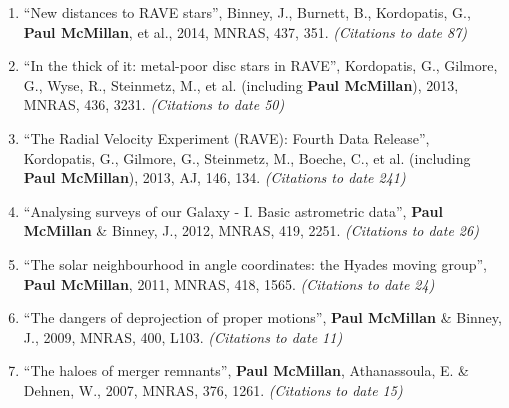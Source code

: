 \documentclass{resume}
\begin{document}
\begin{enumerate}
\item ``New distances to RAVE stars'', Binney, J., Burnett, B., Kordopatis, G., \textbf{Paul McMillan}, et al., 2014, MNRAS, 437, 351. \textit{(Citations to date 87)}

\item ``In the thick of it: metal-poor disc stars in RAVE'', Kordopatis, G., Gilmore, G., Wyse, R., Steinmetz, M., et al. (including \textbf{Paul McMillan}), 2013, MNRAS, 436, 3231. \textit{(Citations to date 50)}

\item ``The Radial Velocity Experiment (RAVE): Fourth Data Release'', Kordopatis, G., Gilmore, G., Steinmetz, M., Boeche, C., et al. (including \textbf{Paul McMillan}), 2013, AJ, 146, 134. \textit{(Citations to date 241)}

\item ``Analysing surveys of our Galaxy - I. Basic astrometric data'', \textbf{Paul McMillan} \& Binney, J., 2012, MNRAS, 419, 2251. \textit{(Citations to date 26)}

\item ``The solar neighbourhood in angle coordinates: the Hyades moving group'', \textbf{Paul McMillan}, 2011, MNRAS, 418, 1565. \textit{(Citations to date 24)}

\item ``The dangers of deprojection of proper motions'', \textbf{Paul McMillan} \& Binney, J., 2009, MNRAS, 400, L103. \textit{(Citations to date 11)}

\item ``The haloes of merger remnants'', \textbf{Paul McMillan}, Athanassoula, E. \& Dehnen, W., 2007, MNRAS, 376, 1261. \textit{(Citations to date 15)}

\end{enumerate}
\end{document}
